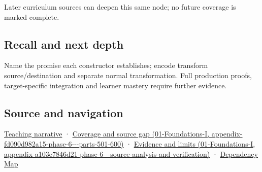 Later curriculum sources can deepen this same node; no future coverage is marked complete.

\subsection{Recall and next depth}\label{appendix-380a220e2529-recall-and-next-depth}

Name the promise each constructor establishes; encode transform source/destination and separate normal transformation. Full production proofs, target-specific integration and learner mastery require further evidence.

\subsection{Source and navigation}\label{appendix-380a220e2529-source-and-navigation}

\hyperref[02-foundations-ii-ch037-types-can-remember-the-promises-that-three-components-forget]{Teaching narrative} · \href{../01-Foundations-I/main.pdf\#nameddest=appendix-fd090d982a15-phase-6---parts-501-600}{Coverage and source gap (01-Foundations-I, appendix-fd090d982a15-phase-6-\/-\/-parts-501-600)} · \href{../01-Foundations-I/main.pdf\#nameddest=appendix-a103e7846d21-phase-6---source-analysis-and-verification}{Evidence and limits (01-Foundations-I, appendix-a103e7846d21-phase-6-\/-\/-source-analysis-and-verification)} · \hyperref[appendix-4ad47bdd269a]{Dependency Map}
